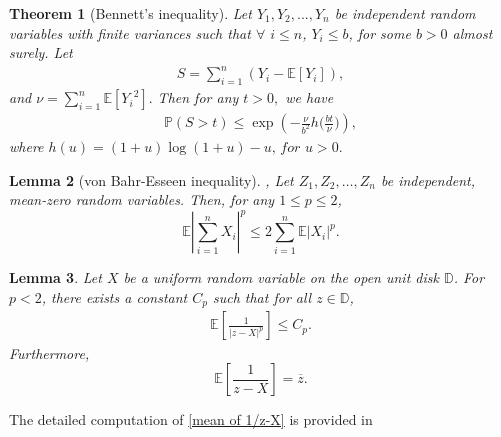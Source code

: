 \documentclass[9pt,a4paper,reqno]{amsart}
\theoremstyle{mine}
\newtheorem{thm}{Theorem}[section]
\newtheorem{Lemma}[thm]{Lemma}
\theoremstyle{definition}
\theoremstyle{remark}
\newcommand{\mb}{\mathbb}
\begin{document}
\begin{thm}[Bennett's inequality]\cite[Theorem 2.9]{concentration-inequalities-BLMbook}\label{Bennett's inequality}
Let $Y_1,Y_2,...,Y_n$ be independent random variables with finite variances such that  $\forall$ $ i \leq n$, $Y_i \leq b$, for some $b > 0$ almost surely. Let
            \begin{align*}
                S=\sum_{i=1}^n\left(Y_i-\mathbb{E}[Y_i]\right),
            \end{align*}
        and $\nu = \sum_{i=1}^n\mathbb{E}[{Y_i}^2] .$ Then for any $t >0,$ we have
            \begin{align*}
                \mathbb{P}(S > t)\leq \exp\left(-\frac{\nu}{b^2}h\Big(\frac{bt}{\nu}\Big)\right),
            \end{align*}
        where $h(u) = (1 + u) \log(1 + u)- u \textit{, for } u > 0.$
    \end{thm}


   \begin{Lemma}[von Bahr-Esseen inequality]
\cite[Page 9]{Kabluchko-Seidel}, \cite{vonBahr-Esseen} \label{BE-ineq}
   Let $Z_1, Z_2, \dots, Z_n$ be independent, mean-zero random variables. 
Then, for any $1 \leq p \leq 2$, 
\[
    \mathbb{E}\left| \sum_{i=1}^n X_i \right|^p 
    \leq 2 \sum_{i=1}^n \mathbb{E}|X_i|^p .
\] 
\end{Lemma} 

\begin{Lemma} \cite[Lemma~2.4]{Ghosh-numberofcomponents}\label{lemma: p<2 moment bound for uniform on disk}
     Let $X$ be a uniform random variable on the open unit disk $\mathbb{D}$. For $ p<2 $, there exists a constant $C_p$ such that for all $ z \in \mathbb{D}$,
    \begin{align}
            \mb{E}\left[\frac{1}{|z-X|^p}\right] \leq C_p.
        \end{align}
        Furthermore, 
        \begin{equation}\label{mean of 1/z-X}
             \mb{E}\left[\frac{1}{z-X}\right]  = \overline{z}.
        \end{equation}
\end{Lemma}

The detailed computation of \eqref{mean of 1/z-X} is provided in \cite[Example~3.2]{Kabluchko-Seidel}
\end{document}
